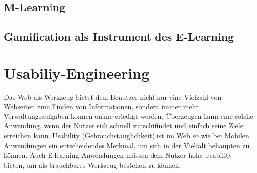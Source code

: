 \documentclass[a4paper, 12pt, twoside, BCOR=20mm, DIV=calc, abstracton, parskip=half*, toc=bibliography, toc=listof, headsepline, footsepline, headings=small, numbers=enddot]{scrreprt}
\begin{document}
%
%
%
%
%
%
%
%
\section{M-Learning}

\section{Gamification als Instrument des E-Learning}


\chapter{Usabiliy-Engineering}
Das Web als Werkzeug bietet dem Benutzer nicht nur eine Vielzahl von Webseiten zum Finden von Informationen, sondern immer mehr Verwaltungsaufgaben können online erledigt werden. Überzeugen kann eine solche Anwendung, wenn der Nutzer sich schnell zurechtfindet und einfach seine Ziele erreichen kann. Usability (Gebrauchstauglichkeit) ist im Web so wie bei Mobilen Anwendungen ein entscheidendes Merkmal, um sich in der Vielfalt behaupten zu können. Auch E-learning Anwendungen müssen dem Nutzer hohe Usability bieten, um als brauchbares Werkzeug bestehen zu können.\newline
\end{document}
